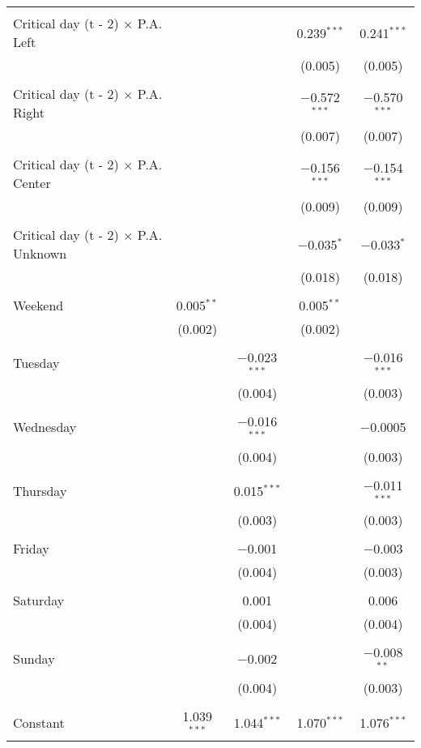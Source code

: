 \documentclass[
]{article}
\begin{document}
\begin{table}[!htbp]
{\begin{tabular}{@{\extracolsep{5pt}}lcccc}
  & & & & \\ 
 Critical day (t - 2) $\times$ P.A. Left &  &  & 0.239$^{***}$ & 0.241$^{***}$ \\ 
  &  &  & (0.005) & (0.005) \\ 
  & & & & \\ 
 Critical day (t - 2) $\times$ P.A. Right &  &  & $-$0.572$^{***}$ & $-$0.570$^{***}$ \\ 
  &  &  & (0.007) & (0.007) \\ 
  & & & & \\ 
 Critical day (t - 2) $\times$ P.A. Center &  &  & $-$0.156$^{***}$ & $-$0.154$^{***}$ \\ 
  &  &  & (0.009) & (0.009) \\ 
  & & & & \\ 
 Critical day (t - 2) $\times$ P.A. Unknown &  &  & $-$0.035$^{*}$ & $-$0.033$^{*}$ \\ 
  &  &  & (0.018) & (0.018) \\ 
  & & & & \\ 
 Weekend & 0.005$^{**}$ &  & 0.005$^{**}$ &  \\ 
  & (0.002) &  & (0.002) &  \\ 
  & & & & \\ 
 Tuesday &  & $-$0.023$^{***}$ &  & $-$0.016$^{***}$ \\ 
  &  & (0.004) &  & (0.003) \\ 
  & & & & \\ 
 Wednesday &  & $-$0.016$^{***}$ &  & $-$0.0005 \\ 
  &  & (0.004) &  & (0.003) \\ 
  & & & & \\ 
 Thursday &  & 0.015$^{***}$ &  & $-$0.011$^{***}$ \\ 
  &  & (0.003) &  & (0.003) \\ 
  & & & & \\ 
 Friday &  & $-$0.001 &  & $-$0.003 \\ 
  &  & (0.004) &  & (0.003) \\ 
  & & & & \\ 
 Saturday &  & 0.001 &  & 0.006 \\ 
  &  & (0.004) &  & (0.004) \\ 
  & & & & \\ 
 Sunday &  & $-$0.002 &  & $-$0.008$^{**}$ \\ 
  &  & (0.004) &  & (0.003) \\ 
  & & & & \\ 
 Constant & 1.039$^{***}$ & 1.044$^{***}$ & 1.070$^{***}$ & 1.076$^{***}$ \\ 

\end{tabular}}
\end{table}
\end{document}
